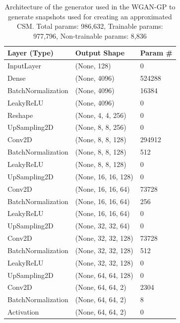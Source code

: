 \documentclass{article}
\begin{document}
\begin{table}[]
    \begin{tabular}{|l|l|l|}
        \hline
        \textbf{Layer (Type)} & \textbf{Output Shape} & \textbf{Param \#} \\ \hline
        InputLayer            & (None, 128)           & 0                 \\ \hline
        Dense                 & (None, 4096)          & 524288            \\ \hline
        BatchNormalization    & (None, 4096)          & 16384             \\ \hline
        LeakyReLU             & (None, 4096)          & 0                 \\ \hline
        Reshape               & (None, 4, 4, 256)     & 0                 \\ \hline
        UpSampling2D          & (None, 8, 8, 256)     & 0                 \\ \hline
        Conv2D                & (None, 8, 8, 128)     & 294912            \\ \hline
        BatchNormalization    & (None, 8, 8, 128)     & 512               \\ \hline
        LeakyReLU             & (None, 8, 8, 128)     & 0                 \\ \hline
        UpSampling2D          & (None, 16, 16, 128)   & 0                 \\ \hline
        Conv2D                & (None, 16, 16, 64)    & 73728             \\ \hline
        BatchNormalization    & (None, 16, 16, 64)    & 256               \\ \hline
        LeakyReLU             & (None, 16, 16, 64)    & 0                 \\ \hline
        UpSampling2D          & (None, 32, 32, 64)    & 0                 \\ \hline
        Conv2D                & (None, 32, 32, 128)   & 73728             \\ \hline
        BatchNormalization    & (None, 32, 32, 128)   & 512               \\ \hline
        LeakyReLU             & (None, 32, 32, 128)   & 0                 \\ \hline
        UpSampling2D          & (None, 64, 64, 128)   & 0                 \\ \hline
        Conv2D                & (None, 64, 64, 2)     & 2304              \\ \hline
        BatchNormalization    & (None, 64, 64, 2)     & 8                 \\ \hline
        Activation            & (None, 64, 64, 2)     & 0                 \\ \hline
        \end{tabular}
    \caption{Architecture of the generator used in the WGAN-GP to generate snapshots used for creating an approximated CSM. Total params: 986,632, Trainable params: 977,796, Non-trainable params: 8,836}
    \label{tab:snapshots_generator_WGANGP_architecture}
\end{table}
\end{document}

